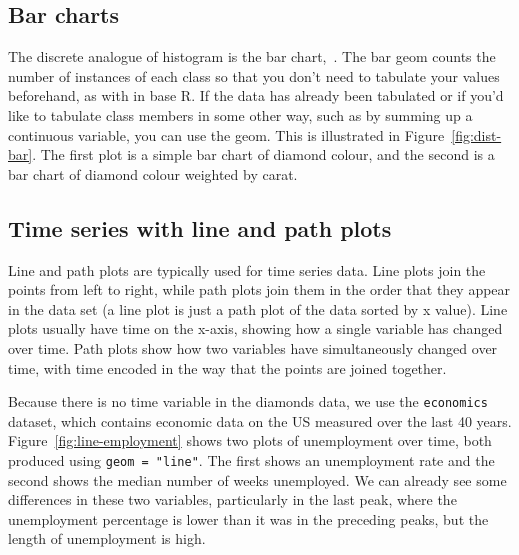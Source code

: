 \subsection{Bar charts}
\label{sub:bar}

The discrete analogue of histogram is the bar chart,~. The bar geom counts the number of instances of each class so that you don't need to tabulate your values beforehand, as with  in base R. If the data has already been tabulated or if you'd like to tabulate class members in some other way, such as by summing up a continuous variable, you can use the  geom. This is illustrated in Figure~\ref{fig:dist-bar}. The first plot is a simple bar chart of diamond colour, and the second is a bar chart of diamond colour weighted by carat.

% 


\subsection{Time series with line and path plots}
\label{sub:line}

Line and path plots are typically used for time series data.  Line plots join the points from left to right, while path plots join them in the order that they appear in the data set (a line plot is just a path plot of the data sorted by x value).  Line plots usually have time on the x-axis, showing how a single variable has changed over time.  Path plots show how two variables have simultaneously changed over time, with time encoded in the way that the points are joined together.

Because there is no time variable in the diamonds data, we use the {\tt economics} dataset, which contains economic data on the US measured over the last 40 years. Figure~\ref{fig:line-employment} shows two plots of unemployment over time, both produced using {\tt geom = "line"}. The first shows an unemployment rate and the second shows the median number of weeks unemployed. We can already see some differences in these two variables, particularly in the last peak, where the unemployment percentage is lower than it was in the preceding peaks, but the length of unemployment is high.


